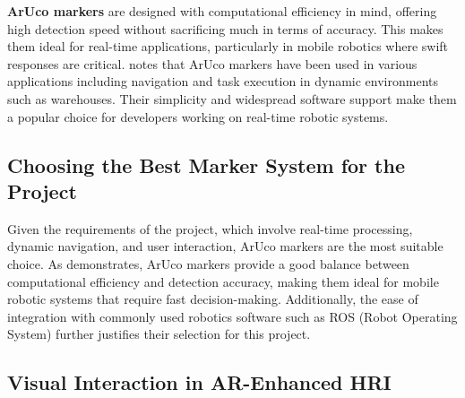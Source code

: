 \textbf{ArUco markers} are designed with computational efficiency in mind, offering high detection speed without sacrificing much in terms of accuracy. This makes them ideal for real-time applications, particularly in mobile robotics where swift responses are critical. \cite{Husar2022} notes that ArUco markers have been used in various applications including navigation and task execution in dynamic environments such as warehouses. Their simplicity and widespread software support make them a popular choice for developers working on real-time robotic systems.

\begin{table}[h]
\centering
\caption{Comparison of Fiducial Marker Systems}
\end{table}


\subsection{Choosing the Best Marker System for the Project}

Given the requirements of the project, which involve real-time processing, dynamic navigation, and user interaction, ArUco markers are the most suitable choice. As \cite{Filus2023} demonstrates, ArUco markers provide a good balance between computational efficiency and detection accuracy, making them ideal for mobile robotic systems that require fast decision-making. Additionally, the ease of integration with commonly used robotics software such as ROS (Robot Operating System) further justifies their selection for this project.

\subsection{Visual Interaction in AR-Enhanced HRI}

